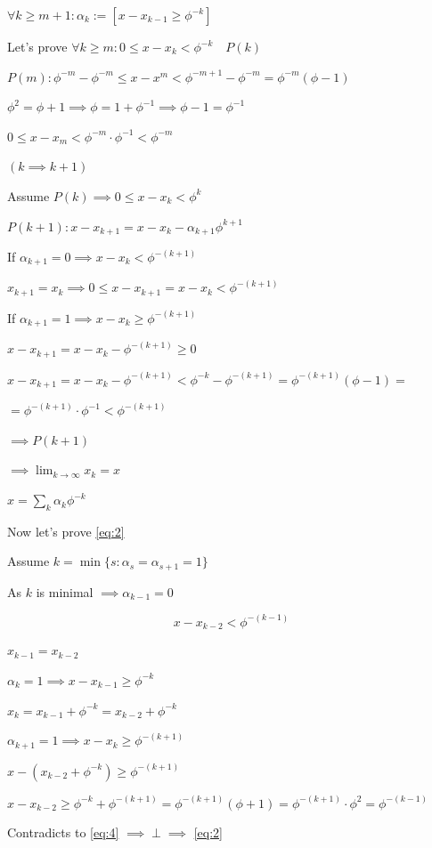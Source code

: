 \documentclass{article}
\begin{document}
$\forall k \geq m + 1: \alpha_{k} := [x-x_{k-1} \geq \phi^{-k}]$

Let's prove $\forall k \geq m: 0 \leq x - x_k < \phi^{-k} \quad P(k)$

$P(m): \phi^{-m} - \phi^{-m} \leq x - x^m < \phi^{-m+1} - \phi^{-m} = \phi^{-m}(\phi - 1)$

$\phi^2 = \phi + 1 \implies \phi = 1 + \phi^{-1} \implies \phi - 1 = \phi^{-1}$

$0 \leq x - x_m < \phi^{-m}\cdot\phi^{-1} < \phi^{-m}$

$(k \implies k + 1)$

Assume $P(k) \implies 0 \leq x - x_k < \phi^{k}$

$P(k+1): x - x_{k+1} = x-x_k - \alpha_{k+1}\phi^{k+1}$

If $\alpha_{k+1} = 0 \implies x - x_k < \phi^{-(k+1)}$

$x_{k+1} = x_k \implies 0 \leq x - x_{k+1} = x - x_k < \phi^{-(k+1)}$

If $\alpha_{k+1} = 1 \implies x - x_k \geq \phi^{-(k+1)}$

$x - x_{k+1} = x - x_k - \phi^{-(k+1)} \geq 0$

$x - x_{k+1} = x - x_k - \phi^{-(k+1)} < \phi^{-k} - \phi^{-(k+1)} = \phi^{-(k+1)} (\phi - 1) =$

$= \phi^{-(k+1)} \cdot \phi^{-1} < \phi^{-(k+1)}$

$\implies P(k+1)$

$\implies \lim_{k \to \infty} x_k = x$

$x = \sum_{k} \alpha_k \phi^{-k}$

Now let's prove \eqref{eq:2}

Assume $k = \min \{ s: \alpha_s = \alpha_{s+1} = 1 \}$

As $k$ is minimal $\implies \alpha_{k-1} = 0$

\[x - x_{k-2} < \phi^{-(k-1)} \tag{4}\label{eq:4}\]

$x_{k-1} = x_{k-2}$

$\alpha_k = 1 \implies x - x_{k-1} \geq \phi^{-k}$

$x_k = x_{k-1} + \phi^{-k} = x_{k-2} + \phi^{-k}$

$\alpha_{k+1} = 1 \implies x - x_{k} \geq \phi^{-(k+1)}$

$x - (x_{k-2} + \phi^{-k}) \geq \phi^{-(k+1)}$

$x - x_{k-2} \geq \phi^{-k} + \phi^{-(k+1)} = \phi^{-(k+1)}(\phi + 1) =  \phi^{-(k+1)} \cdot \phi^2 = \phi^{-(k-1)}$

Contradicts to \eqref{eq:4} $\implies \perp \implies$ \eqref{eq:2}
\end{document}
